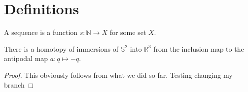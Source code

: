 %



\section{Definitions}

\begin{theorem}[Sequence]
  \label{thm:sequence}
  \leanok
  A sequence is a function $s : ℕ → X$ for some set $X$.
\end{theorem}

\begin{theorem}[Smale 1958]
  \label{thm:sphere_eversion}
  \leanok
  There is a homotopy of immersions of $𝕊^2$ into $ℝ^3$ from the inclusion map to
  the antipodal map $a : q ↦ -q$.
\end{theorem}
  
\begin{proof}
  \leanok
  This obviously follows from what we did so far. Testing changing my branch
\end{proof}